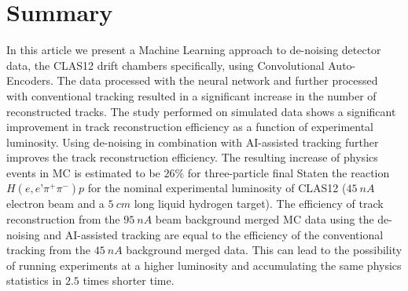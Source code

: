 \section{Summary}

In this article we present a Machine Learning approach to de-noising detector data, the CLAS12 drift chambers specifically, using Convolutional Auto-Encoders. The data processed with the neural network and further processed with conventional tracking resulted in a significant increase in the number of reconstructed tracks. The study performed on simulated data shows a significant improvement in track reconstruction efficiency as a function of experimental luminosity. Using de-noising in combination with AI-assisted tracking further improves the track reconstruction efficiency. 
The resulting increase of physics events in MC is estimated to be $26\%$ for three-particle final Staten the reaction 
$H(e,e’\pi^+\pi^-)p$ for the nominal experimental luminosity of CLAS12 ($45~nA$ electron beam and a $5~cm$ long 
liquid hydrogen target). The efficiency of track reconstruction from the $95~nA$ beam background merged MC data using the 
de-noising and AI-assisted tracking are equal to the efficiency of the conventional tracking from the $45~nA$ background merged data.
This can lead to the possibility of running experiments at a higher luminosity and accumulating the same physics statistics in $2.5$ times shorter time.


